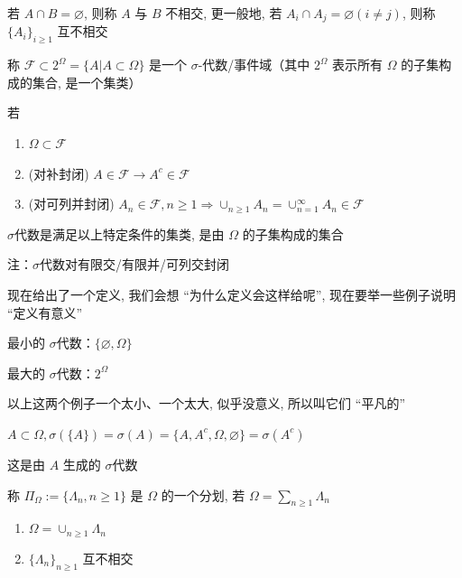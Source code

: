 \begin{definition}
    若 $A\cap B=\varnothing$, 则称 $A$ 与 $B$ 不相交, 更一般地, 若 $A_i\cap A_j=\varnothing (i\neq j)$, 则称 $\{A_i\}_{i\geq 1}$ 互不相交
\end{definition}

\begin{definition}[$\sigma$-代数]
    称 $\mathcal{F}\subset 2^{\Omega}=\{A|A\subset \Omega\}$ 是一个 $\sigma$-代数/事件域（其中 $2^{\Omega}$ 表示所有 $\Omega$ 的子集构成的集合, 是一个集类）

    若\begin{enumerate}
        \item $\Omega\subset \mathcal{F}$
        \item (对补封闭) $A\in \mathcal{F}\rightarrow A^c\in \mathcal{F}$
        \item (对可列并封闭) $A_n\in \mathcal{F}, n\geq 1\Rightarrow \cup_{n\geq 1}A_n=\cup_{n=1}^{\infty} A_n\in\mathcal{F}$
    \end{enumerate}

    $\sigma$代数是满足以上特定条件的集类, 是由 $\Omega$ 的子集构成的集合

    注：$\sigma$代数对有限交/有限并/可列交封闭
\end{definition}

现在给出了一个定义, 我们会想 “为什么定义会这样给呢”, 现在要举一些例子说明 “定义有意义”

\begin{example}
    最小的 $\sigma$代数：$\{\varnothing, \Omega\}$ 

    最大的 $\sigma$代数：$2^{\Omega}$
\end{example}

以上这两个例子一个太小、一个太大, 似乎没意义, 所以叫它们 “平凡的”

\begin{example}
    $A\subset \Omega, \sigma(\{A\})=\sigma(A)=\{A, A^c, \Omega, \varnothing\}=\sigma(A^c)$

    这是由 $A$ 生成的 $\sigma$代数
\end{example}

\begin{definition}[划分/分割]\label{def:partition}
    称 $\Pi_{\Omega}:= \{\Lambda_n, n\geq 1\}$ 是 $\Omega$ 的一个分划, 若 $\Omega=\sum_{n\geq 1}\Lambda_n$

    \begin{enumerate}
        \item $\Omega=\cup_{n\geq 1}\Lambda_n$
        \item $\{\Lambda_n\}_{n\geq 1}$ 互不相交
    \end{enumerate}
\end{definition}

